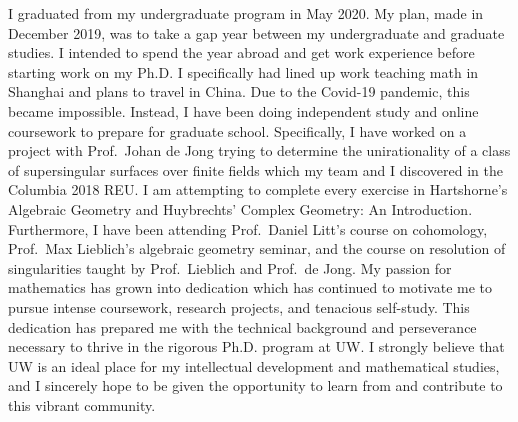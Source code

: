 \documentclass[11pt]{article}
\begin{document}
I graduated from my undergraduate program in May 2020. My plan, made in December 2019, was to take a gap year between my undergraduate and graduate studies. I intended to spend the year abroad and get work experience before starting work on my Ph.D. I specifically had lined up work teaching math in Shanghai and plans to travel in China. Due to the Covid-19 pandemic, this became impossible. Instead, I have been doing independent study and online coursework to prepare for graduate school. Specifically, I have worked on a project with Prof.\ Johan de Jong trying to determine the unirationality of a class of supersingular surfaces over finite fields which my team and I discovered in the Columbia 2018 REU. I am attempting to complete every exercise in Hartshorne’s Algebraic Geometry and Huybrechts’ Complex Geometry: An Introduction. Furthermore, I have been attending Prof.\ Daniel Litt’s course on \etale cohomology, Prof.\ Max Lieblich’s algebraic geometry seminar, and the course on resolution of singularities taught by Prof.\ Lieblich and Prof.\ de Jong. My passion for mathematics has grown into dedication which has continued to motivate me to pursue intense coursework, research projects, and tenacious self-study. This dedication has prepared me with the technical background and perseverance necessary to thrive in the rigorous Ph.D. program at UW. I strongly believe that UW is an ideal place for my intellectual development and mathematical studies, and I sincerely hope to be given the opportunity to learn from and contribute to this vibrant community. 
\end{document}
